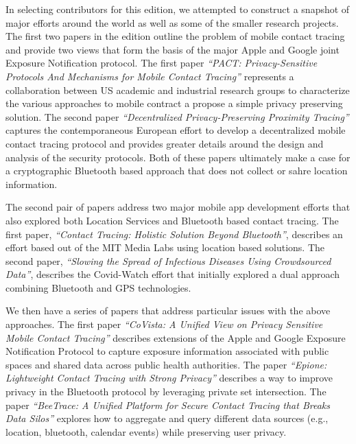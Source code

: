 \documentclass[11pt]{article}
\begin{document}
In selecting contributors for this edition, we attempted to construct a snapshot of major efforts around the world as well as some of the smaller research projects.
The first two papers in the edition outline the problem of mobile contact tracing and provide two views that form the basis of the major Apple and Google joint Exposure Notification protocol.
The first paper \emph{``{PACT}:   Privacy-Sensitive Protocols And Mechanisms for Mobile Contact Tracing''} represents a collaboration between US academic and industrial research groups to characterize the various approaches to mobile contract a propose a simple privacy preserving solution. 
The second paper \emph{``Decentralized Privacy-Preserving Proximity Tracing''} captures the contemporaneous European effort to develop a decentralized mobile contact tracing protocol and provides greater details around the design and analysis of the security protocols.
Both of these papers ultimately make a case for a cryptographic Bluetooth based approach that does not collect or sahre location information.  


The second pair of papers address two major mobile app development efforts that also explored both Location Services and Bluetooth based contact tracing.  
The first paper, \emph{``Contact Tracing: Holistic Solution Beyond Bluetooth''}, describes an effort based out of the MIT Media Labs using location based solutions.  
The second paper, \emph{``Slowing the Spread of Infectious Diseases Using Crowdsourced Data''}, describes the Covid-Watch effort that initially explored a dual approach combining Bluetooth and GPS technologies. 



We then have a series of papers that address particular issues with the above approaches. 
The first paper \emph{``CoVista: A Unified View on Privacy Sensitive Mobile Contact Tracing''} describes extensions of the Apple and Google Exposure Notification Protocol to capture exposure information associated with public spaces and shared data across public health authorities.  
The paper \emph{``Epione: Lightweight Contact Tracing with Strong Privacy''} describes a way to improve privacy in the Bluetooth protocol by leveraging private set intersection.  
The paper \emph{``BeeTrace: A Unified Platform for Secure Contact Tracing that Breaks Data Silos''} explores how to aggregate and query different data sources (e.g., location, bluetooth, calendar events) while preserving user privacy.
\end{document}
